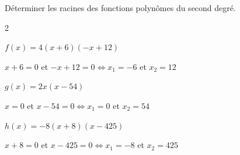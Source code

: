 \documentclass[12pt,a4paper]{article}  %
\begin{document}
\begin{center}
	
\end{center}

\vspace{.05cm} 


Déterminer les racines des fonctions polynômes du second degré.
\begin{multicols}{2}
\begin{enumMet}
    \item {} $f(x)=4(x+6)(-x+12)$ 
    \begin{corrBox}
    	$x+6=0$ et $-x+12=0 \iff x_1=-6$ et $x_2=12$
    \end{corrBox}
    \item $g(x)=2x(x-54)$ 
    \begin{corrBox}
    	$x=0$ et $x-54=0 \iff x_1=0$ et $x_2=54$
    \end{corrBox}
    \item $h(x)=-8(x+8)(x-425)$ 
    \begin{corrBox}
    	$ x+8=0$ et $x-425=0 \iff x_1=-8$ et $x_2=425$
    \end{corrBox}
\end{enumMet}
\end{multicols}

\vspace{-0.3cm}
\end{document}
